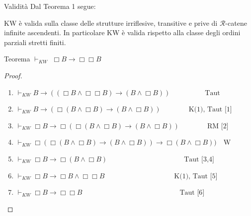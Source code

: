 \documentclass{beamer}
\begin{document}
\begin{frame}{Validità}
Dal Teorema 1 segue:
\begin{teorema}
KW è valida sulla classe delle strutture irriflesive, transitive e prive di $\mathcal{R}$-catene infinite ascendenti. In particolare KW è valida rispetto alla classe degli ordini parziali stretti finiti.
\end{teorema}
\end{frame}






\begin{frame}{Teorema $\vdash_{KW} $  $\Box B \to \Box\Box B$}
\begin{proof}
    \begin{enumerate}
        \item $\vdash_{KW} B \to ((\Box B \wedge \Box\Box B) \to (B \wedge \Box B))\quad\qquad\qquad\text{Taut}$
        \item $\vdash_{KW} B \to (\Box (B \wedge \Box B) \to (B \wedge \Box B))\quad\qquad\quad\text{K(1), Taut [1]}$
        \item $\vdash_{KW} \Box B \to \Box(\Box (B \wedge \Box B) \to (B \wedge \Box B))\qquad\qquad\text{RM [2]}$
        \item $\vdash_{KW} \Box(\Box (B \wedge \Box B) \to (B \wedge \Box B)) \to \Box(B \wedge \Box B))\quad\text{W}$
        \item $\vdash_{KW} \Box B \to \Box(B \wedge \Box B)\qquad\qquad\qquad\qquad\qquad\quad\text{Taut [3,4]}$
        \item $\vdash_{KW} \Box B \to \Box B \wedge \Box\Box B\qquad\qquad\qquad\qquad\qquad\text{K(1), Taut [5]}$
        \item $\vdash_{KW} \Box B \to \Box\Box B\qquad\qquad\qquad\qquad\qquad\qquad\qquad\text{Taut [6]}$
    \end{enumerate}
\end{proof}

\end{frame}
\end{document}
